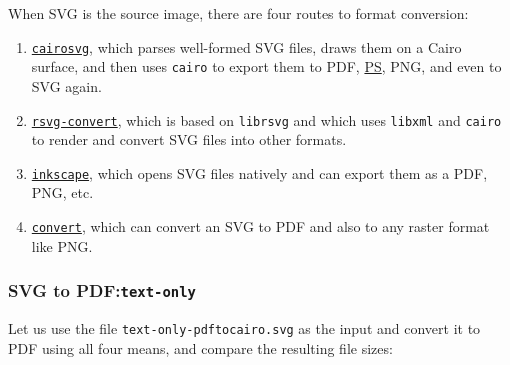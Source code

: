 \documentclass[
  a4paper,
]{article}
\begin{document}
When SVG is the source image, there are four routes to format
conversion:

\begin{enumerate}
\item
  \href{https://cairosvg.org/}{\texttt{cairosvg}}, which parses
  well-formed SVG files, draws them on a Cairo surface, and then uses
  \texttt{cairo} to export them to PDF,
  \href{https://techterms.com/definition/postscript}{PS}, PNG, and even
  to SVG again.
\item
  \href{https://en.wikipedia.org/wiki/Librsvg}{\texttt{rsvg-convert}},
  which is based on \texttt{librsvg} and which uses \texttt{libxml} and
  \texttt{cairo} to render and convert SVG files into other formats.
\item
  \href{https://inkscape.org/}{\texttt{inkscape}}, which opens SVG files
  natively and can export them as a PDF, PNG, etc.
\item
  \href{https://imagemagick.org/script/convert.php}{\texttt{convert}},
  which can convert an SVG to PDF and also to any raster format like
  PNG.
\end{enumerate}

\hypertarget{svg-to-pdftext-only}{%
\subsubsection{\texorpdfstring{SVG to
PDF:\texttt{text-only}}{SVG to PDF:text-only}}\label{svg-to-pdftext-only}}

Let us use the file \texttt{text-only-pdftocairo.svg} as the input and
convert it to PDF using all four means, and compare the resulting file
sizes:
\end{document}

